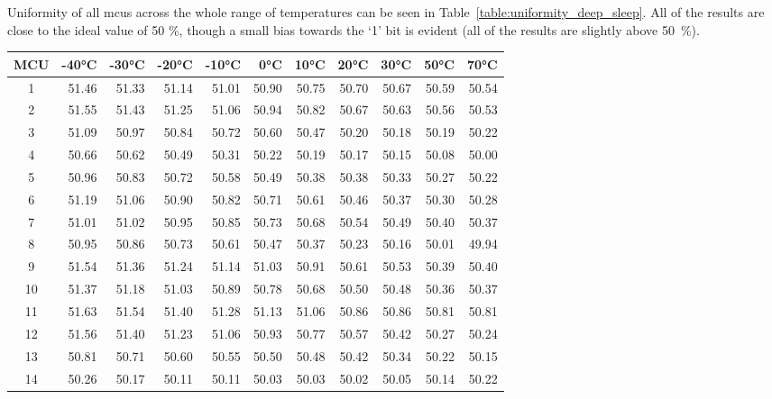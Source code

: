 Uniformity of all \glspl{mcu} across the whole range of temperatures can be seen in Table~\ref{table:uniformity_deep_sleep}. All of the results are close to the ideal value of 50 \%, though a small bias towards the `1' bit is evident (all of the results are slightly above 50~\%).

\begin{table}[ht!]
    \centering
    \begin{tabular}{c||rrrrrrrrrr}
    \toprule
    \textbf{MCU} & \textbf{-40°C} & \textbf{-30°C} & \textbf{-20°C} & \textbf{-10°C} & \textbf{0°C} & \textbf{10°C} & \textbf{20°C} & \textbf{30°C} & \textbf{50°C} & \textbf{70°C} \\
    \midrule
    1    &  51.46 &  51.33 &  51.14 &  51.01 & 50.90 & 50.75 & 50.70 & 50.67 & 50.59 & 50.54 \\
    2    &  51.55 &  51.43 &  51.25 &  51.06 & 50.94 & 50.82 & 50.67 & 50.63 & 50.56 & 50.53 \\
    3    &  51.09 &  50.97 &  50.84 &  50.72 & 50.60 & 50.47 & 50.20 & 50.18 & 50.19 & 50.22 \\
    4    &  50.66 &  50.62 &  50.49 &  50.31 & 50.22 & 50.19 & 50.17 & 50.15 & 50.08 & 50.00 \\
    5    &  50.96 &  50.83 &  50.72 &  50.58 & 50.49 & 50.38 & 50.38 & 50.33 & 50.27 & 50.22 \\
    6    &  51.19 &  51.06 &  50.90 &  50.82 & 50.71 & 50.61 & 50.46 & 50.37 & 50.30 & 50.28 \\
    7    &  51.01 &  51.02 &  50.95 &  50.85 & 50.73 & 50.68 & 50.54 & 50.49 & 50.40 & 50.37 \\
    8    &  50.95 &  50.86 &  50.73 &  50.61 & 50.47 & 50.37 & 50.23 & 50.16 & 50.01 & 49.94 \\
    9    &  51.54 &  51.36 &  51.24 &  51.14 & 51.03 & 50.91 & 50.61 & 50.53 & 50.39 & 50.40 \\
    10   &  51.37 &  51.18 &  51.03 &  50.89 & 50.78 & 50.68 & 50.50 & 50.48 & 50.36 & 50.37 \\
    11   &  51.63 &  51.54 &  51.40 &  51.28 & 51.13 & 51.06 & 50.86 & 50.86 & 50.81 & 50.81 \\
    12   &  51.56 &  51.40 &  51.23 &  51.06 & 50.93 & 50.77 & 50.57 & 50.42 & 50.27 & 50.24 \\
    13   &  50.81 &  50.71 &  50.60 &  50.55 & 50.50 & 50.48 & 50.42 & 50.34 & 50.22 & 50.15 \\
    14   &  50.26 &  50.17 &  50.11 &  50.11 & 50.03 & 50.03 & 50.02 & 50.05 & 50.14 & 50.22 \\

\end{tabular}
\end{table}

